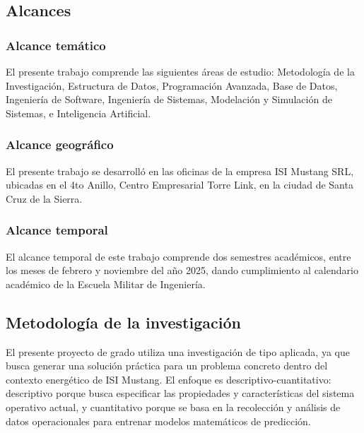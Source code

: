\documentclass{univalle-perfil}
\begin{document}
\subsection{Alcances}

\subsubsection{Alcance temático}

El presente trabajo comprende las siguientes áreas de estudio: Metodología de la
Investigación, Estructura de Datos, Programación Avanzada, Base de Datos,
Ingeniería de Software, Ingeniería de Sistemas, Modelación y Simulación de
Sistemas, e Inteligencia Artificial.

\subsubsection{Alcance geográfico}

El presente trabajo se desarrolló en las oficinas de la empresa ISI Mustang SRL,
ubicadas en el 4to Anillo, Centro Empresarial Torre Link, en la ciudad de Santa Cruz
de la Sierra.

\subsubsection{Alcance temporal}

El alcance temporal de este trabajo comprende dos semestres académicos, entre los
meses de febrero y noviembre del año 2025, dando cumplimiento al calendario
académico de la Escuela Militar de Ingeniería.


\subsection{Metodología de la investigación}

El presente proyecto de grado utiliza una investigación de tipo aplicada, ya que busca
generar una solución práctica para un problema concreto dentro del contexto
energético de ISI Mustang. El enfoque es descriptivo-cuantitativo: descriptivo porque
busca especificar las propiedades y características del sistema operativo actual, y
cuantitativo porque se basa en la recolección y análisis de datos operacionales para
entrenar modelos matemáticos de predicción.
\end{document}

